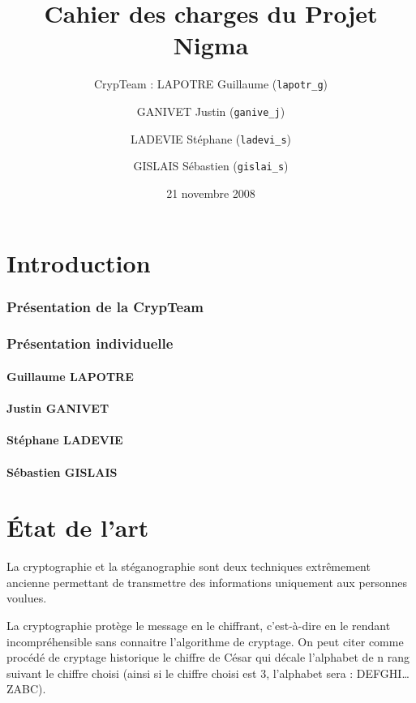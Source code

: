 \documentclass[a4paper,12pt]{article}
\title{Cahier des charges du Projet Nigma}
\author{CrypTeam : LAPOTRE Guillaume (\texttt{lapotr\_g}) \and GANIVET Justin (\texttt{ganive\_j}) \and LADEVIE Stéphane (\texttt{ladevi\_s}) \and GISLAIS Sébastien (\texttt{gislai\_s})}
\date{21 novembre 2008}
\begin{document}
\maketitle{}
\tableofcontents
\newpage
\part{Introduction}

\section {Présentation de la CrypTeam}

\section {Présentation individuelle}

\subsection{Guillaume LAPOTRE}

\subsection{Justin GANIVET}

\subsection{Stéphane LADEVIE}

\subsection{Sébastien GISLAIS}

\newpage
\part{\'{E}tat de l'art}
La cryptographie et la stéganographie sont deux techniques extrêmement ancienne permettant de transmettre des informations uniquement aux personnes voulues.

La cryptographie protège le message en le chiffrant, c'est-à-dire en le rendant incompréhensible sans connaitre l'algorithme de cryptage. On peut citer comme procédé de cryptage historique le chiffre de César qui décale l'alphabet de n rang suivant le chiffre choisi (ainsi si le chiffre choisi est 3, l'alphabet sera : DEFGHI\dots{}ZABC).
\end{document}
